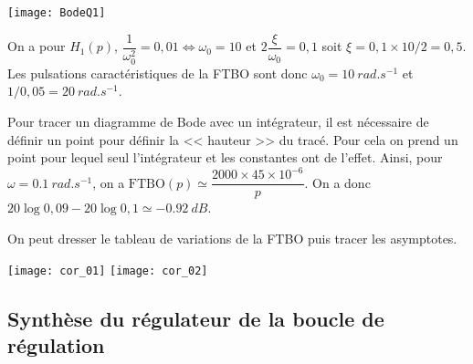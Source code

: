 \fi


\ifprof
\else
\begin{marginfigure}
\texttt{[image: BodeQ1]}
\end{marginfigure}
\fi


\ifprof
\begin{corrige}
On a pour $H_1(p)$, $\dfrac{1}{\omega_0^2}=0,01 \Leftrightarrow \omega_0=10$ et $2\dfrac{\xi}{\omega_0}=0,1$ soit $\xi = 0,1\times 10 / 2 = 0,5$. Les pulsations caractéristiques de la FTBO sont donc $\omega_0=\SI{10}{rad.s^{-1}}$ et $1/0,05 = \SI{20}{rad.s^{-1}}$.

Pour tracer un diagramme de Bode avec un intégrateur, il est nécessaire de définir un point pour définir la << hauteur >> du tracé. Pour cela on prend un point pour lequel seul l'intégrateur et les constantes ont de l'effet. Ainsi, pour $\omega=\SI{0,1}{rad.s^{-1}}$, on a $\text{FTBO}(p) \simeq \dfrac{2000\times 45\times 10^{-6}}{p}$. On a donc $20\log 0,09 - 20 \log 0,1 \simeq \SI{-0,92}{dB}$.

On peut dresser le tableau de variations de la FTBO puis tracer les asymptotes. 
\begin{center}
\texttt{[image: cor\_01]}
\texttt{[image: cor\_02]}
\end{center}
\end{corrige}
\else
\fi

\subsection*{Synthèse du régulateur de la boucle de régulation}

